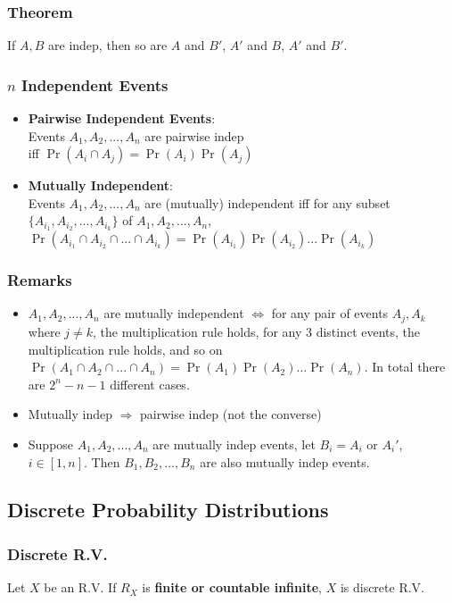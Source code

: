 \documentclass[10pt]{article}
\begin{document}
\subsubsection*{Theorem}
If $A, B$ are indep, then so are $A$ and $B'$, $A'$ and $B$, $A'$ and $B'$.
\subsubsection*{$n$ Independent Events}
\begin{itemize}
    \item \textbf{Pairwise Independent Events}:\\
          Events $A_1,A_2,...,A_n$ are pairwise indep\\
          iff $\Pr(A_i\cap A_j) = \Pr(A_i)\Pr(A_j)$
    \item \textbf{Mutually Independent}:\\
          Events $A_1,A_2,...,A_n$ are (mutually) independent iff for any subset $\{A_{i_1}, A_{i_2},...,A_{i_k}\}$ of $A_1,A_2,...,A_n$,\\
          $\Pr(A_{i_1}\cap A_{i_2}\cap ...\cap A_{i_k}) = \Pr(A_{i_1})\Pr(A_{i_2})...\Pr(A_{i_k})$
\end{itemize}
\subsubsection*{Remarks}
\begin{itemize}
    \item $A_1,A_2,...,A_n$ are mutually independent $\Leftrightarrow$ for any pair of events $A_j,A_k$ where $j\neq k$, the multiplication rule holds, for any 3 distinct events, the multiplication rule holds, and so on $\Pr(A_1\cap A_2\cap ... \cap A_n) = \Pr(A_1)\Pr(A_2) ...\Pr(A_n)$. In total there are $2^n - n - 1$ different cases.
    \item Mutually indep $\Rightarrow$ pairwise indep (not the converse)
    \item Suppose $A_1,A_2,...,A_n$ are mutually indep events, let $B_i=A_i$ or $A_i'$, $i \in [1, n]$. Then $B_1,B_2,...,B_n$ are also mutually indep events.
\end{itemize}

\subsection*{Discrete Probability Distributions}
\subsubsection*{Discrete R.V.}
Let $X$ be an R.V. If $R_X$ is \textbf{finite or countable infinite}, $X$ is discrete R.V.
\end{document}

